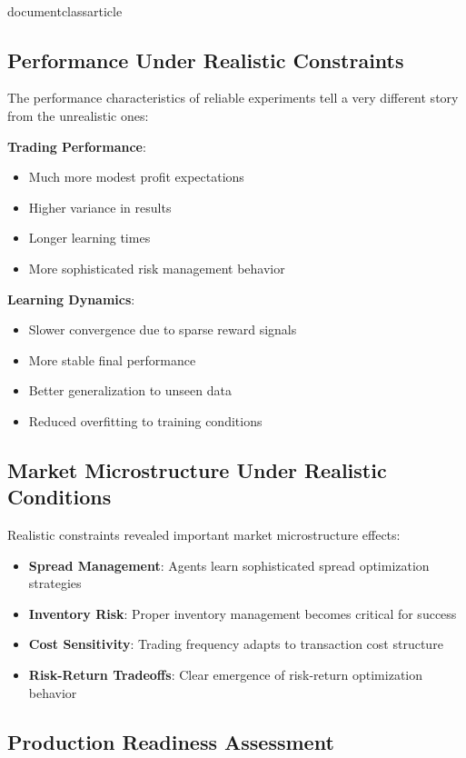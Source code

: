 \\documentclass{article}
\begin{document}
\subsection{Performance Under Realistic Constraints}

The performance characteristics of reliable experiments tell a very different story from the unrealistic ones:

\textbf{Trading Performance}:
\begin{itemize}
\item Much more modest profit expectations
\item Higher variance in results
\item Longer learning times
\item More sophisticated risk management behavior
\end{itemize}

\textbf{Learning Dynamics}:
\begin{itemize}
\item Slower convergence due to sparse reward signals
\item More stable final performance
\item Better generalization to unseen data
\item Reduced overfitting to training conditions
\end{itemize}

\subsection{Market Microstructure Under Realistic Conditions}

Realistic constraints revealed important market microstructure effects:

\begin{itemize}
\item \textbf{Spread Management}: Agents learn sophisticated spread optimization strategies
\item \textbf{Inventory Risk}: Proper inventory management becomes critical for success
\item \textbf{Cost Sensitivity}: Trading frequency adapts to transaction cost structure
\item \textbf{Risk-Return Tradeoffs}: Clear emergence of risk-return optimization behavior
\end{itemize}

\subsection{Production Readiness Assessment}
\end{document}
